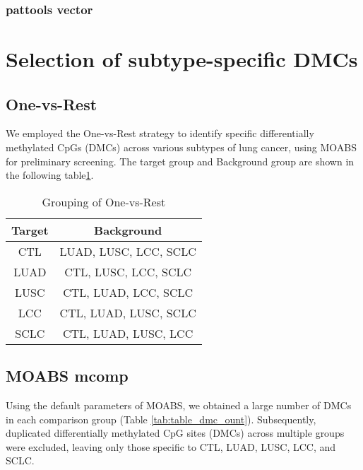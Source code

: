 \documentclass[10pt]{article}
\begin{document}
 \subsubsection{pattools vector}

\section{Selection of subtype-specific DMCs}\label{sec:selection-of-dmcs}

\subsection{One-vs-Rest}

We employed the One-vs-Rest strategy to identify specific differentially methylated CpGs (DMCs) across various
subtypes of lung cancer, using MOABS\cite{sun_moabs_2014} for preliminary screening. The target group and Background
group are shown in the following table\ref*{tab:grouping}.

\begin{table}[htbp]
    \begin{center}
        \caption{ Grouping of One-vs-Rest }
        \begin{tabular}{|c|c|}
            \hline
            Target & Background            \\
            \hline
            CTL    & LUAD, LUSC, LCC, SCLC \\
            LUAD   & CTL, LUSC, LCC, SCLC  \\
            LUSC   & CTL, LUAD, LCC, SCLC  \\
            LCC    & CTL, LUAD, LUSC, SCLC \\
            SCLC   & CTL, LUAD, LUSC, LCC  \\
            \hline
        \end{tabular}
    \end{center}
    \label{tab:grouping}
\end{table}

\subsection{MOABS mcomp}

Using the default parameters of MOABS, we obtained a large number of DMCs in each comparison group (Table \ref{tab:table_dmc_ount}).
Subsequently, duplicated differentially methylated CpG sites (DMCs) across multiple groups were excluded, leaving
only those specific to CTL, LUAD, LUSC, LCC, and SCLC.
\end{document}
